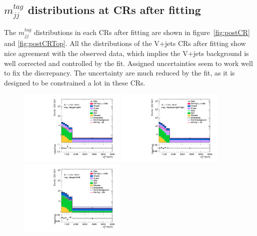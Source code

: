 \subsection{ $m^{tag}_{jj}$ distributions at CRs after fitting }
The $m^{tag}_{jj}$ distributions in each CRs after fitting are shown in figure~\ref{fig:postCR} and \ref{fig:postCRTop}.
All the distributions of the V+jets CRs after fitting show nice agreement with the observed data, which implies the V+jets background is well corrected and controlled by the fit. Assigned uncertainties seem to work well to fix the discrepancy. %
The uncertainty are much reduced by the fit, as it is designed to be constrained a lot in these CRs.
\begin{figure}[]
    \centering
    \includegraphics[width=0.45\textwidth]{figures/PostFit/Region_distMTagJets_DCRVjetMer_BMin0_J0_incJet1_L0_T0_incFat1_Y6051_incTag1_Fat1_GlobalFit_unconditionnal_mu1log}
    \includegraphics[width=0.45\textwidth]{figures/PostFit/Region_distMTagJets_DCRVjetFid_BMin0_T0_Y6051_incTag1_J2_L0_incJet1_GlobalFit_unconditionnal_mu1log}
    \\
    \includegraphics[width=0.45\textwidth]{figures/PostFit/Region_disttagMjj_DCRVjetMerged_BMin0_J0_incJet1_L1_T0_incFat1_Y6051_incTag1_Fat1_GlobalFit_unconditionnal_mu1log}

\end{figure}
